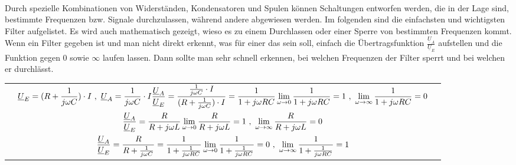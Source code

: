 \documentclass{article}
\begin{document}
\begin{mdframed}
\centering
\vspace{0.2\baselineskip}
\\
\vspace{0.2\baselineskip}
\justify
Durch spezielle Kombinationen von Widerständen, Kondensatoren und Spulen können Schaltungen entworfen werden, die in der Lage sind, bestimmte Frequenzen bzw. Signale durchzulassen, während andere abgewiesen werden. Im folgenden sind die einfachsten und wichtigsten Filter aufgelistet. Es wird auch mathematisch gezeigt, wieso es zu einem Durchlassen oder einer Sperre von bestimmten Frequenzen kommt. Wenn ein Filter gegeben ist und man nicht direkt erkennt, was für einer das sein soll, einfach die Übertragsfunktion $\frac{\underline{U}_A}{\underline{U}_E}$ aufstellen und die Funktion gegen 0 sowie $\infty$ laufen lassen. Dann sollte man sehr schnell erkennen, bei welchen Frequenzen der Filter sperrt und bei welchen er durchlässt.\\
\justify
\centering
\begin{tabular}{ccc}
     \raisebox{-0.5\height}{} & \begin{minipage}{0.37\textwidth}$\displaystyle \underline{U}_E = (R + \frac{1}{j\omega C}) \cdot I \,\, , \,\, \underline{U}_A = \frac{1}{j\omega C} \cdot I \\ \frac{\underline{U}_A}{\underline{U}_E} = \frac{\frac{1}{j\omega C} \cdot I}{(R + \frac{1}{j\omega C}) \cdot I} = \frac{1}{1 + j\omega RC} \\ \lim_{\omega \to 0} \frac{1}{1 + j\omega RC} = 1 \,\, , \,\, \lim_{\omega \to \infty} \frac{1}{1 + j\omega RC} = 0$\end{minipage} & \multirow{2}{*}{\raisebox{-0.4\height}{}}\\
     
     \raisebox{-0.5\height}{} & \begin{minipage}{0.37\textwidth}$\displaystyle \frac{\underline{U}_A}{\underline{U}_E} = \frac{R}{R + j\omega L} \\ \lim_{\omega \to 0} \frac{R}{R + j\omega L} = 1 \,\, , \,\, \lim_{\omega \to \infty} \frac{R}{R + j\omega L} = 0$\end{minipage} & \\ \hline
     
     \raisebox{-0.5\height}{} & \begin{minipage}{0.37\textwidth}$\displaystyle \frac{\underline{U}_A}{\underline{U}_E} = \frac{R}{R + \frac{1}{j\omega C}} = \frac{1}{1 + \frac{1}{j\omega RC}} \\ \lim_{\omega \to 0} \frac{1}{1 + \frac{1}{j\omega RC}} = 0 \,\, , \,\, \lim_{\omega \to \infty} \frac{1}{1 + \frac{1}{j\omega RC}} = 1$\end{minipage} & \multirow{2}{*}{\raisebox{-0.4\height}{}}\\
     

\end{tabular}
\end{mdframed}
\end{document}
